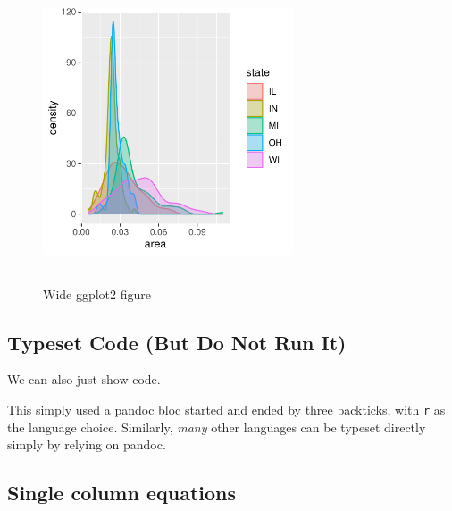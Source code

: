 \documentclass[letterpaper,9pt,twocolumn,twoside,]{pinp}
\begin{document}
\begin{figure}
  \begin{center}
    \includegraphics[width=0.66\textwidth, height=3.5in]{densities} 
  \end{center}
  \caption{Wide ggplot2 figure}\label{fig}
\end{figure}

\hypertarget{typeset-code-but-do-not-run-it}{%
\subsection{Typeset Code (But Do Not Run
It)}\label{typeset-code-but-do-not-run-it}}

We can also just show code.

\begin{Shaded}
\begin{Highlighting}[]
\StringTok{ }\NormalTok{faithful[,}\NormalTok{]}
\StringTok{ }
\end{Highlighting}
\end{Shaded}

This simply used a pandoc bloc started and ended by three backticks,
with \texttt{r} as the language choice. Similarly, \emph{many} other
languages can be typeset directly simply by relying on pandoc.

\hypertarget{single-column-equations}{%
\subsection{Single column equations}\label{single-column-equations}}
\end{document}

